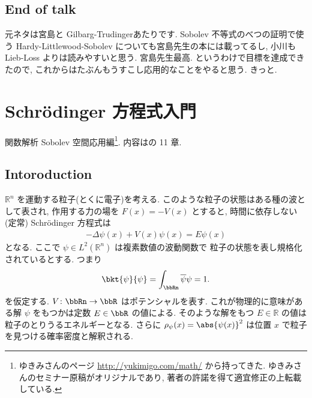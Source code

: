 \documentclass[openany, a4paper, oneside]{jsbook}
\begin{document}
\section{End of talk}

元ネタは宮島\cite{ShizuoMiyajima1}と Gilbarg-Trudinger\cite{GilbargTrudinger1}あたりです.
Sobolev 不等式のべつの証明で使う Hardy-Littlewood-Sobolev についても宮島先生の本には載ってるし,
小川\cite{TakayoshiOgawa1}も Lieb-Loss よりは読みやすいと思う.
宮島先生最高.
というわけで目標を達成できたので, これからはたぶんもうすこし応用的なことをやると思う.
きっと.
\chapter{Schr\"odinger 方程式入門}

関数解析 Sobolev 空間応用編\footnote{ゆきみさんのページ \url{http://yukimigo.com/math/} から持ってきた.
ゆきみさんのセミナー原稿がオリジナルであり, 著者の許諾を得て適宜修正の上転載している.}.
内容は\cite{LiebLoss1}の 11 章.
\section{Intoroduction}

$\mathbb{R}^n$ を運動する粒子(とくに電子)を考える.
このような粒子の状態はある種の波として表され,
作用する力の場を $F(x) = - V(x)$ とすると,
時間に依存しない (定常) Schr\"odinger 方程式は
\begin{align}
 -\Delta \psi (x) + V(x) \psi (x)
 =
 E \psi (x)
\end{align}
となる.
ここで $\psi \in L^2(\mathbb{R}^n)$ は複素数値の波動関数で
粒子の状態を表し規格化されているとする.
つまり
\begin{align}
 \bkt{\psi}{\psi}
 =
 \int_{\bbRn} \overline{\psi} \psi
 = 1.
\end{align}
を仮定する.
$V \colon \bbRn \to \bbR$ はポテンシャルを表す.
これが物理的に意味がある解 $\psi$ をもつかは定数 $E \in \bbR$ の値による.
そのような解をもつ $E \in \mathbb{R}$ の値は粒子のとりうるエネルギーとなる.
さらに $\rho_{\psi} (x)= \abs{\psi (x)}^2$ は位置 $x$ で粒子を見つける確率密度と解釈される.
\end{document}
